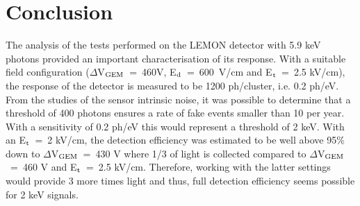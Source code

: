 \documentclass[a4paper]{jpconf}
\begin{document}
\section{Conclusion}

The analysis of the tests performed on the LEMON detector with 5.9 keV
photons provided an important characterisation of its response. With a
suitable field configuration ($\Delta$V$_{\rm GEM}$~=~460V, E$_{\rm
  d}$~=~600~V/cm and E$_{\rm t}$~=~2.5 kV/cm), the response of the
detector is measured to be 1200 ph/cluster, i.e. 0.2 ph/eV.  From the
studies of the sensor intrinsic noise, it was possible to determine
that a threshold of 400 photons ensures a rate of fake events smaller
than 10 per year. With a sensitivity of 0.2 ph/eV this would represent
a threshold of 2 keV.  With an E$_{\rm t}$~=~2 kV/cm, the detection
efficiency was estimated to be well above 95\% down to $\Delta$V$_{\rm
  GEM}$~=~430 V where 1/3 of light is collected compared to
$\Delta$V$_{\rm GEM}$~=~460 V and E$_{\rm t}$~=~2.5 kV/cm.  Therefore,
working with the latter settings would provide 3 more times light and
thus, full detection efficiency seems possible for 2 keV signals.

{}

\end{document}
